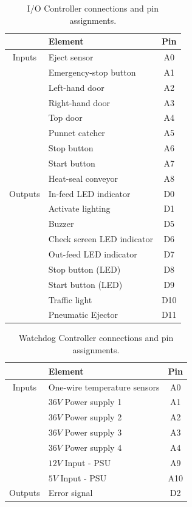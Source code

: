 \documentclass[fleqn,twoside,12pt]{report}
\begin{document}
\begin{table}[h]
	\centering
	\caption{I/O Controller connections and pin assignments.}
	\label{tab:IO_tasks}
	\begin{tabular}{clc}
		\toprule
				& \textbf{Element} & \textbf{Pin} \\[8pt]
		\midrule
		Inputs 	& Eject sensor 			& A0 \\[4pt]
				& Emergency-stop button	& A1 \\[4pt]
				& Left-hand door 		& A2 \\[4pt]
				& Right-hand door 		& A3 \\[4pt]
				& Top door 				& A4 \\[4pt]
				& Punnet catcher 		& A5 \\[4pt]
				& Stop button 			& A6 \\[4pt]
				& Start button	 		& A7 \\[4pt]
				& Heat-seal conveyor	& A8 \\[4pt]
				
		Outputs	& In-feed LED indicator			& D0  \\[4pt]
				& Activate lighting				& D1  \\[4pt]
				& Buzzer						& D5  \\[4pt]
				& Check screen LED indicator	& D6  \\[4pt]
				& Out-feed LED indicator 		& D7  \\[4pt]
				& Stop button (LED)				& D8  \\[4pt]
				& Start button (LED)			& D9  \\[4pt]
				& Traffic light					& D10  \\[4pt]
				& Pneumatic Ejector				& D11  \\[4pt]
		\bottomrule
		
	\end{tabular}
\end{table}




\begin{table}[h]
	\centering
	\caption{Watchdog Controller connections and pin assignments.}
	\label{tab:watchdog_tasks}
	\begin{tabular}{clc}
		\toprule
				& \textbf{Element} & \textbf{Pin} \\[8pt]
		\midrule
		Inputs 	& One-wire temperature sensors 	& A0 \\[4pt]
				& $36V$ Power supply 1 			& A1 \\[4pt]
				& $36V$ Power supply 2 			& A2 \\[4pt]
				& $36V$ Power supply 3 			& A3 \\[4pt]
				& $36V$ Power supply 4 			& A4 \\[4pt]
				& $12V$ Input - PSU 			& A9 \\[4pt]
				& $5V$ Input - PSU 				& A10 \\[4pt]
		
		Outputs	& Error signal			& D2  \\[4pt]
		\bottomrule
		
	\end{tabular}
\end{table}
\end{document}
